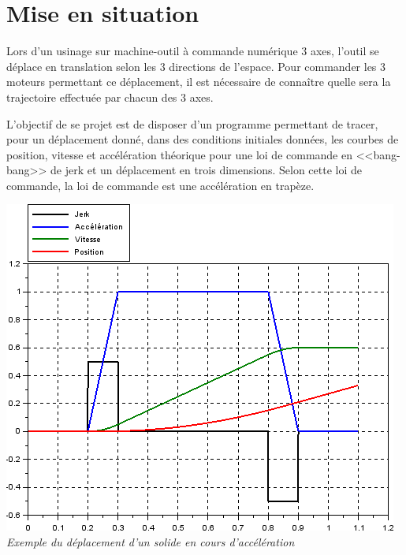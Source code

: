 \documentclass[10pt]{article}
\newif\ifxp
\begin{document}
\ifxp

\else

\fi



 \renewcommand{\baselinestretch}{1.2}
\setlength{\parskip}{2ex plus 0.5ex minus 0.2ex}



\section{Mise en situation}
\begin{minipage}[c]{.53\linewidth}
Lors d'un usinage sur machine-outil à commande numérique 3 axes, l'outil se déplace en translation selon les 3 directions de l'espace. Pour commander les 3 moteurs permettant ce déplacement, il est nécessaire de connaître quelle sera la trajectoire effectuée par chacun des 3 axes.
\begin{obj}
L'objectif de se projet est de disposer d'un programme permettant de tracer, pour un déplacement donné, dans des conditions initiales données, les courbes de position, vitesse et accélération théorique pour une loi de commande en <<bang-bang>> de jerk et un déplacement en trois dimensions. Selon cette loi de commande, la loi de commande est une accélération en trapèze.
\end{obj}


\end{minipage} \hfill
\begin{minipage}[c]{.45\linewidth}
\begin{center}
\includegraphics[width=\textwidth]{images/bang}
\textit{Exemple du déplacement d'un solide en cours d'accélération}
\end{center}
\end{minipage}
\end{document}
